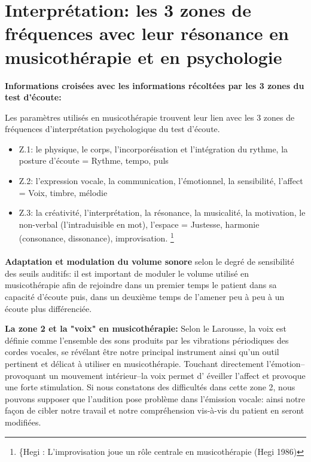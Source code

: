       


\section{Interprétation: les 3 zones de fréquences avec leur résonance en musicothérapie et en
  psychologie}


	\textbf{Informations croisées avec les informations récoltées par les 3 
          zones du test d'écoute:}
          
Les paramètres utilisés en musicothérapie trouvent leur lien avec les
3 zones de fréquences d'interprétation psychologique du test d'écoute.

\begin{itemize}
 \item  Z.1: le physique, le corps, l'incorporéisation et
l'intégration du rythme,
la posture d'écoute  =  Rythme, tempo, puls 

\item  Z.2:  l'expression vocale, la communication,
l'émotionnel, la sensibilité, l'affect = Voix, timbre, mélodie 

\item Z.3: la créativité, l'interprétation, la
résonance, la musicalité, la motivation, le non-verbal (l'intraduisible en mot), l'espace = Justesse, harmonie (consonance,
dissonance), improvisation. \footnote{\{Hegi : L'improvisation joue un rôle centrale en musicothérapie (Hegi 1986)} 
\end{itemize}


\paragraph{}

\textbf{Adaptation et modulation du volume sonore} selon le degré de
sensibilité des seuils auditifs: il est important de moduler le volume utilisé en
musicothérapie afin de rejoindre dans un premier temps  le patient dans sa capacité d'écoute
puis, dans un deuxième temps de l'amener peu à
peu à un
écoute plus différenciée.

\textbf{ La zone 2 et la "voix" en musicothérapie:}
Selon le Larousse, la voix est définie comme
l'ensemble des sons produits par les vibrations périodiques des
cordes vocales, se révélant être notre principal instrument ainsi qu'un outil pertinent et délicat
à utiliser en musicothérapie. Touchant 
directement 
l'émotion--provoquant un mouvement intérieur--la voix permet d'
éveiller l'affect
et provoque une forte stimulation. Si nous constatons des difficultés dans cette zone 2, nous pouvons supposer que l'audition pose problème dans l'émission
vocale: ainsi notre façon de cibler notre travail et notre compréhension
vis-à-vis du patient en seront modifiées. 


